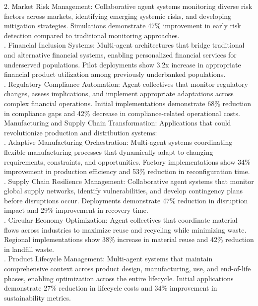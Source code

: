 2. Market Risk Management: Collaborative agent systems monitoring diverse risk factors across markets, identifying emerging systemic risks, and developing mitigation strategies. Simulations demonstrate 47\% improvement in early risk detection compared to traditional monitoring approaches.\\ . Financial Inclusion Systems: Multi-agent architectures that bridge traditional and alternative financial systems, enabling personalized financial services for underserved populations. Pilot deployments show 3.2x increase in appropriate financial product utilization among previously underbanked populations.\\ . Regulatory Compliance Automation: Agent collectives that monitor regulatory changes, assess implications, and implement appropriate adaptations across complex financial operations. Initial implementations demonstrate 68\% reduction in compliance gaps and 42\% decrease in compliance-related operational costs.\\ \newline
Manufacturing and Supply Chain Transformation: Applications that could revolutionize production and distribution systems:\\ . Adaptive Manufacturing Orchestration: Multi-agent systems coordinating flexible manufacturing processes that dynamically adapt to changing requirements, constraints, and opportunities. Factory implementations show 34\% improvement in production efficiency and 53\% reduction in reconfiguration time.\\ . Supply Chain Resilience Management: Collaborative agent systems that monitor global supply networks, identify vulnerabilities, and develop contingency plans before disruptions occur. Deployments demonstrate 47\% reduction in disruption impact and 29\% improvement in recovery time.\\ . Circular Economy Optimization: Agent collectives that coordinate material flows across industries to maximize reuse and recycling while minimizing waste. Regional implementations show 38\% increase in material reuse and 42\% reduction in landfill waste.\\ . Product Lifecycle Management: Multi-agent systems that maintain comprehensive context across product design, manufacturing, use, and end-of-life phases, enabling optimization across the entire lifecycle. Initial applications demonstrate 27\% reduction in lifecycle costs and 34\% improvement in sustainability metrics.\\ \newline
